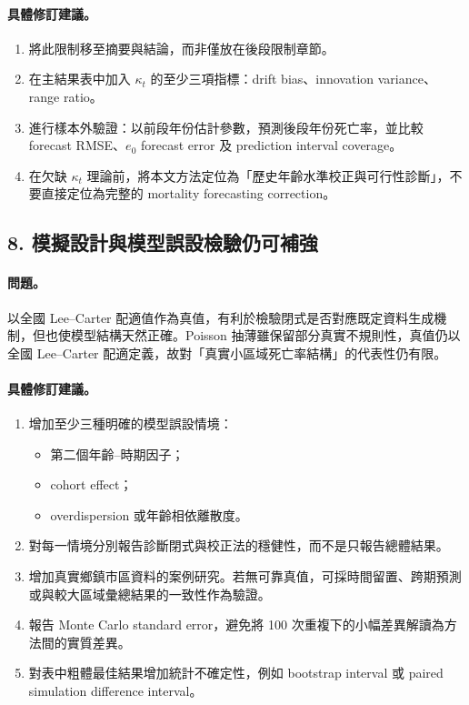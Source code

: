 \documentclass[12pt,a4paper]{article}
\begin{document}
\paragraph{具體修訂建議。}
\begin{enumerate}
  \item 將此限制移至摘要與結論，而非僅放在後段限制章節。
  \item 在主結果表中加入 $\kappa_t$ 的至少三項指標：drift bias、innovation variance、range ratio。
  \item 進行樣本外驗證：以前段年份估計參數，預測後段年份死亡率，並比較 forecast RMSE、$e_0$ forecast error 及 prediction interval coverage。
  \item 在欠缺 $\kappa_t$ 理論前，將本文方法定位為「歷史年齡水準校正與可行性診斷」，不要直接定位為完整的 mortality forecasting correction。
\end{enumerate}

\subsection*{8. 模擬設計與模型誤設檢驗仍可補強}

\paragraph{問題。}
以全國 Lee--Carter 配適值作為真值，有利於檢驗閉式是否對應既定資料生成機制，但也使模型結構天然正確。Poisson 抽薄雖保留部分真實不規則性，真值仍以全國 Lee--Carter 配適定義，故對「真實小區域死亡率結構」的代表性仍有限。

\paragraph{具體修訂建議。}
\begin{enumerate}
  \item 增加至少三種明確的模型誤設情境：
  \begin{itemize}
    \item 第二個年齡--時期因子；
    \item cohort effect；
    \item overdispersion 或年齡相依離散度。
  \end{itemize}
  \item 對每一情境分別報告診斷閉式與校正法的穩健性，而不是只報告總體結果。
  \item 增加真實鄉鎮市區資料的案例研究。若無可靠真值，可採時間留置、跨期預測或與較大區域彙總結果的一致性作為驗證。
  \item 報告 Monte Carlo standard error，避免將 100 次重複下的小幅差異解讀為方法間的實質差異。
  \item 對表中粗體最佳結果增加統計不確定性，例如 bootstrap interval 或 paired simulation difference interval。
\end{enumerate}
\end{document}
